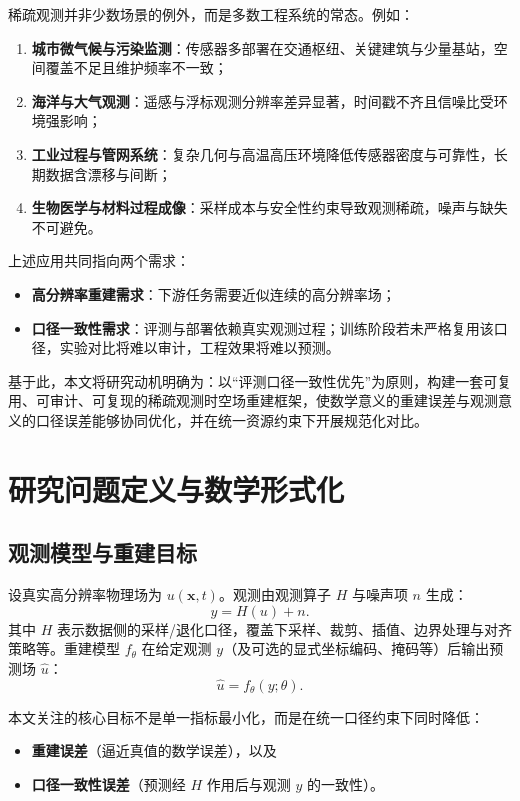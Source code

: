 稀疏观测并非少数场景的例外，而是多数工程系统的常态。例如：
\begin{enumerate}
  \item \textbf{城市微气候与污染监测}：传感器多部署在交通枢纽、关键建筑与少量基站，空间覆盖不足且维护频率不一致；
  \item \textbf{海洋与大气观测}：遥感与浮标观测分辨率差异显著，时间戳不齐且信噪比受环境强影响；
  \item \textbf{工业过程与管网系统}：复杂几何与高温高压环境降低传感器密度与可靠性，长期数据含漂移与间断；
  \item \textbf{生物医学与材料过程成像}：采样成本与安全性约束导致观测稀疏，噪声与缺失不可避免。
\end{enumerate}

上述应用共同指向两个需求：
\begin{itemize}
  \item \textbf{高分辨率重建需求}：下游任务需要近似连续的高分辨率场；
  \item \textbf{口径一致性需求}：评测与部署依赖真实观测过程；训练阶段若未严格复用该口径，实验对比将难以审计，工程效果将难以预测。
\end{itemize}

基于此，本文将研究动机明确为：以“评测口径一致性优先”为原则，构建一套可复用、可审计、可复现的稀疏观测时空场重建框架，使数学意义的重建误差与观测意义的口径误差能够协同优化，并在统一资源约束下开展规范化对比。

\section{研究问题定义与数学形式化}

\subsection{观测模型与重建目标}

设真实高分辨率物理场为 \(u(\mathbf{x},t)\)。观测由观测算子 \(H\) 与噪声项 \(n\) 生成：
\begin{equation}
  y = H(u) + n .
  \label{eq:obs-model}
\end{equation}
其中 \(H\) 表示数据侧的采样/退化口径，覆盖下采样、裁剪、插值、边界处理与对齐策略等。重建模型 \(f_\theta\) 在给定观测 \(y\)（及可选的显式坐标编码、掩码等）后输出预测场 \(\hat{u}\)：
\begin{equation}
  \hat{u} = f_\theta(y;\theta) .
  \label{eq:recon-model}
\end{equation}

本文关注的核心目标不是单一指标最小化，而是在统一口径约束下同时降低：
\begin{itemize}
  \item \textbf{重建误差}（逼近真值的数学误差），以及
  \item \textbf{口径一致性误差}（预测经 \(H\) 作用后与观测 \(y\) 的一致性）。
\end{itemize}

